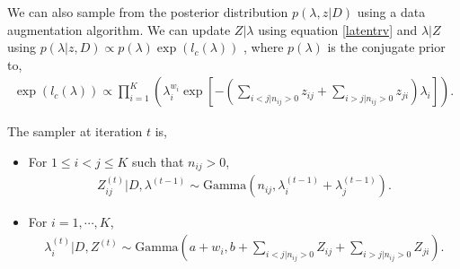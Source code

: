 \documentclass[11pt]{article}
\numberwithin{equation}
{section}
\begin{document}
We can also sample from the posterior distribution $p(\lambda, z|D)$ using a data augmentation algorithm. We can update $Z|\lambda$ using equation \ref{latentrv} and $\lambda|Z$  using $p(\lambda|z,D) \propto p(\lambda)\exp (l_c(\lambda))$ , where $p(\lambda)$ is the conjugate prior to, 
\begin{align}
\exp (l_c(\lambda)) \propto \prod _{i=1}^K \left( \lambda_i^{w_i} \exp \left[ -\left(\sum_{i<j|n_{ij} >0} z_{ij} + \sum_{i>j|n_{ij} >0}z_{ji}\right)\lambda_i \right] \right).
\end{align}

The sampler at iteration $t$ is, 
\begin{itemize}
\item For $1 \leq i<j \leq K$ such that $n_{ij} >0$, 
\begin{align}
Z_{ij}^{(t)} |D,\lambda^{(t-1)} \sim \mathrm{Gamma} (n_{ij}, \lambda_i^{(t-1)} + \lambda_{j}^{(t-1)}).
\end{align}
\item For $i = 1, \cdots, K$, 
\begin{align}
\lambda_i^{(t)} | D,Z^{(t)} \sim \mathrm{Gamma} \left( a + w_i, b + \sum_{i<j|n_{ij} >0} Z_{ij} + \sum_{i>j|n_{ij} >0}Z_{ji} \right).
\end{align}
\end{itemize}
\end{document}
